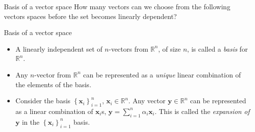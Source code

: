 \documentclass[aspectratio=169]{beamer}
\begin{document}
\begin{frame}[t]{Basis of a vector space}
  How many vectors can we choose from the following vectors spaces before the set becomes linearly dependent?
  \begin{center}
    \begin{center}
    \end{center}
  \end{center}
\end{frame}


\begin{frame}[t]{Basis of a vector space}
  \begin{itemize}
    \item A linearly independent set of $n$-vectors from $\mathbb{R}^n$, of size $n$, is called a \textit{basis} for $\mathbb{R}^n$.
    
    \item Any $n$-vector from $\mathbb{R}^n$ can be represented as a \textit{unique} linear combination of the elements of the basis.
    
    \item Consider the basis $\left\{\mathbf{x}_i\right\}_{i=1}^{n}$, $\mathbf{x}_i \in \mathbb{R}^n$. Any vector $\mathbf{y} \in \mathbb{R}^n$ can be represented as a linear combination of $\mathbf{x}_i$s, $\mathbf{y} = \sum_{i=1}^n \alpha_i\mathbf{x}_i$. This is called the \textit{expansion of} $\mathbf{y}$ in the $\left\{\mathbf{x}_i\right\}_{i=1}^n$ basis.
  \end{itemize}
\end{frame}
\end{document}
